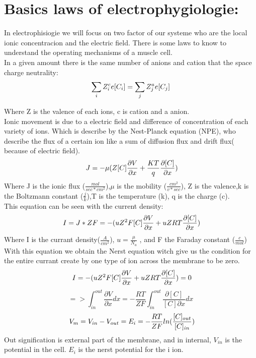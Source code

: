 \documentclass[a4paper,10pt]{report}
\begin{document}
\section{Basics laws of electrophygiologie:}


In electrophisiogie we will focus on two factor of our systeme who are the local ionic concentracion and the electric field.
There is some laws to know to understand the operating mechanisms of a muscle cell.\\
In a given amount there is the same number of anions and cation that the space charge neutrality:
$$
	\sum_{i}Z_{i}^{c}e[C_{i}]=\sum_{j}Z_{j}^{a}e[C_{j}] \\
$$

Where Z is the valence of each ions, c is cation and a anion.\\
Ionic movement is due to a electric field and difference of concentration of each variety of ions. Which is describe by the Nest-Planck equation (NPE), who describe the flux of a certain ion like a sum of diffusion flux and drift flux( because of electric field).\\
$$
	\ J=-\mu(Z[C]\frac{\partial{V}}{\partial{x}}+\frac{KT}{q}\frac{\partial{[C]}}{\partial{x}}) \\
$$
 Where J is the ionic flux ($ \frac{mol}{sec*cm^2} $),$\mu$ is the mobility ($ \frac{cm^2}{v*sec}$), Z is the valence,k is the Boltzmann constant ($ \frac{j}{k}$),T is the temperature (k), q is the charge (c).\\
 This equation can be seen with the current density:\\
 $$
 \ I=J*ZF=-(uZ^2F[C]\frac{\partial{V}}{\partial{x}}+uZRT\frac{\partial{[C]}}{\partial{x}}) \\
 $$
 Where I is the currant density($\frac{A}{cm^2}$),  $u=\frac{\mu}{N_{a}}$ , and F the Faraday constant ($\frac{c}{mol}$)\\
 With this equation we obtain the Nerst equation witch give us the condition for the entire currant create by one type of ion across the membrane to be zero.\\
 $$
 \ I=-(uZ^2F[C]\frac{\partial{V}}{\partial{x}}+uZRT\frac{\partial{[C]}}{\partial{x}})=0 \\
 $$
 $$
 => \int_{in}^{out} \frac{\partial{V}}{\partial{x}}dx=- \frac{RT}{ZF} \int_{in}^{out} \frac{\partial{[C]}}{[C]\partial{x}}dx
 $$
 $$
 \ V_{m}=V_{in}-V_{out}=E_{i}=-\frac{RT}{ZF}ln(\frac{[C]_{out}}{[C]_{in}}) \\
 $$
 Out signification is external part of the membrane, and in internal, $V_{in}$ is the potential in the cell. $E_{i}$ is the nerst potential for the i ion.
\end{document}
